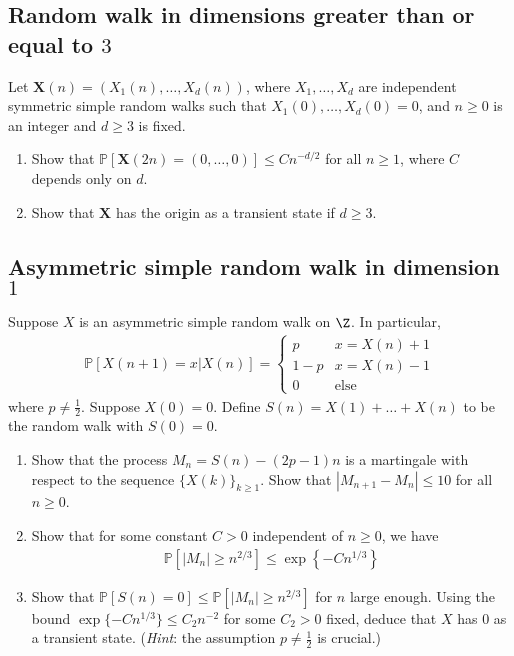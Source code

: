 \documentclass[12pt,reqno]{amsart}
\theoremstyle{definition}
\theoremstyle{remark}
\numberwithin{equation}{section}
\begin{document}
\subsection{Random walk in dimensions greater than or equal to $3$}
Let $\mathbf{X}(n)=(X_{1}(n),\ldots,X_{d}(n))$, where $X_{1},\ldots,X_{d}$ are independent symmetric simple random walks such that $X_{1}(0),\ldots,X_{d}(0)=0$, and $n\geq0$ is an integer and $d\geq3$ is fixed.
\begin{enumerate}
\item Show that $\mathbb{P}[\mathbf{X}(2n)=(0,\ldots,0)]\leq Cn^{-d/2}$ for all $n\geq1$, where $C$ depends only on $d$.
\item Show that $\mathbf{X}$ has the origin as a transient state if $d\geq3$.
\end{enumerate}
\subsection{Asymmetric simple random walk in dimension $1$}
Suppose $X$ is an asymmetric simple random walk on $\Z$. In particular, 
%
\begin{align*}
\mathbb{P}[X(n+1)=x|X(n)]=\begin{cases}p&x=X(n)+1\\1-p&x=X(n)-1\\0&\mathrm{else}\end{cases}
\end{align*}
%
where $p\neq\frac12$. Suppose $X(0)=0$. Define $S(n)=X(1)+\ldots+X(n)$ to be the random walk with $S(0)=0$.
\begin{enumerate}
\item Show that the process $M_{n}=S(n)-(2p-1)n$ is a martingale with respect to the sequence $\{X(k)\}_{k\geq1}$. Show that $|M_{n+1}-M_{n}|\leq 10$ for all $n\geq0$.
\item Show that for some constant $C>0$ independent of $n\geq0$, we have
%
\begin{align*}
\mathbb{P}\left[|M_{n}|\geq n^{2/3}\right]\leq \exp\left\{-Cn^{1/3}\right\}
\end{align*}
%
\item Show that $\mathbb{P}[S(n)=0]\leq\mathbb{P}[|M_{n}|\geq n^{2/3}]$ for $n$ large enough. Using the bound $\exp\{-Cn^{1/3}\}\leq C_{2}n^{-2}$ for some $C_{2}>0$ fixed, deduce that $X$ has $0$ as a transient state. (\emph{Hint}: the assumption $p\neq\frac12$ is crucial.)
\end{enumerate}
\end{document}
